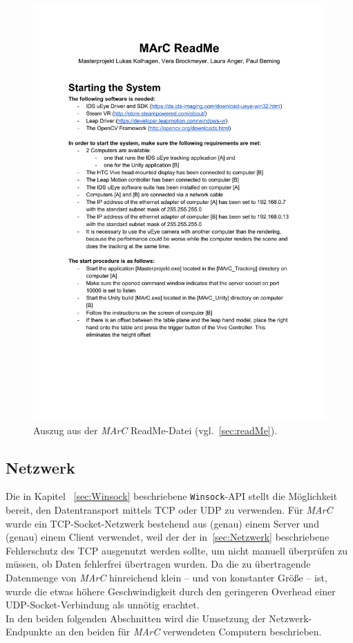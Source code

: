 \begin{figure}
	\centering
	\includegraphics[page=1, trim=1cm 12.25cm 1cm 5.25cm, clip, width=\textwidth]{kapitel/anhang/ReadMe.pdf} 
	\caption{Auszug aus der \emph{MArC} ReadMe-Datei (vgl.~\ref{sec:readMe}).}
	\label{fig:marcReadMe}
\end{figure}

\subsection{Netzwerk}\label{sec:netzwerk}
Die in Kapitel ~\ref{sec:Winsock} beschriebene  \texttt{Winsock}-API stellt die Möglichkeit bereit, den Datentransport mittels TCP oder UDP zu verwenden. Für \emph{MArC} wurde ein TCP-Socket-Netzwerk bestehend aus (genau) einem Server und (genau) einem Client verwendet, weil der der in~\ref{sec:Netzwerk} beschriebene Fehlerschutz des TCP ausgenutzt werden sollte, um nicht manuell überprüfen zu müssen, ob Daten fehlerfrei übertragen wurden. Da die zu übertragende Datenmenge von \emph{MArC} hinreichend klein -- und von konstanter Größe -- ist, wurde die etwas höhere Geschwindigkeit durch den geringeren Overhead einer UDP-Socket-Verbindung als unnötig erachtet.\\
In den beiden folgenden Abschnitten wird die Umsetzung der Netzwerk-Endpunkte an den beiden für \emph{MArC} verwendeten Computern beschrieben.
